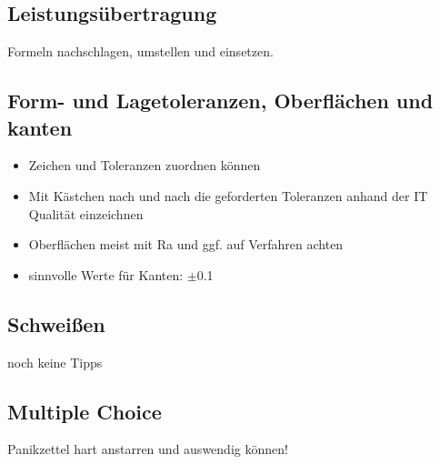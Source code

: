 \documentclass[a4paper,parskip=half*,DIV=7,fontsize=11pt]{scrartcl}
\begin{document}
\subsection{Leistungsübertragung}
	Formeln nachschlagen, umstellen und einsetzen.
	
\subsection{Form- und Lagetoleranzen, Oberflächen und kanten}
\begin{itemize}
	\item Zeichen und Toleranzen zuordnen können
	\item Mit Kästchen nach und nach die geforderten Toleranzen anhand der IT Qualität einzeichnen
	\item Oberflächen meist mit Ra und ggf. auf Verfahren achten
	\item sinnvolle Werte für Kanten: $\pm$0.1
\end{itemize}

\subsection{Schweißen}
noch keine Tipps %

\subsection{Multiple Choice}
Panikzettel hart anstarren und auswendig können!
	
\end{document}
